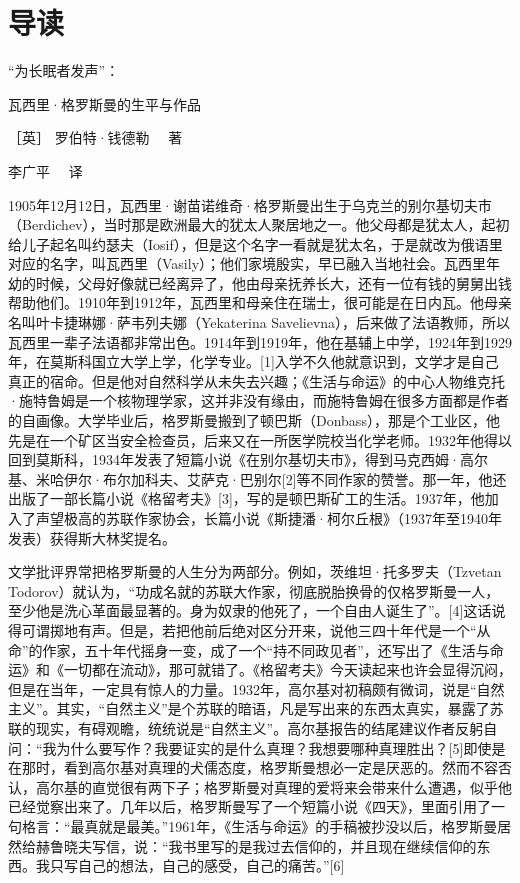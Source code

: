 \section{ 导读}


“为长眠者发声”：

瓦西里·格罗斯曼的生平与作品

［英］ 罗伯特·钱德勒　 著

李广平　 译

1905年12月12日，瓦西里·谢苗诺维奇·格罗斯曼出生于乌克兰的别尔基切夫市（Berdichev），当时那是欧洲最大的犹太人聚居地之一。他父母都是犹太人，起初给儿子起名叫约瑟夫（Iosif），但是这个名字一看就是犹太名，于是就改为俄语里对应的名字，叫瓦西里（Vasily）；他们家境殷实，早已融入当地社会。瓦西里年幼的时候，父母好像就已经离异了，他由母亲抚养长大，还有一位有钱的舅舅出钱帮助他们。1910年到1912年，瓦西里和母亲住在瑞士，很可能是在日内瓦。他母亲名叫叶卡捷琳娜·萨韦列夫娜（Yekaterina Savelievna），后来做了法语教师，所以瓦西里一辈子法语都非常出色。1914年到1919年，他在基辅上中学，1924年到1929年，在莫斯科国立大学上学，化学专业。[1]入学不久他就意识到，文学才是自己真正的宿命。但是他对自然科学从未失去兴趣；《生活与命运》的中心人物维克托·施特鲁姆是一个核物理学家，这并非没有缘由，而施特鲁姆在很多方面都是作者的自画像。大学毕业后，格罗斯曼搬到了顿巴斯（Donbass），那是个工业区，他先是在一个矿区当安全检查员，后来又在一所医学院校当化学老师。1932年他得以回到莫斯科，1934年发表了短篇小说《在别尔基切夫市》，得到马克西姆·高尔基、米哈伊尔·布尔加科夫、艾萨克·巴别尔[2]等不同作家的赞誉。那一年，他还出版了一部长篇小说《格留考夫》[3]，写的是顿巴斯矿工的生活。1937年，他加入了声望极高的苏联作家协会，长篇小说《斯捷潘·柯尔丘根》（1937年至1940年发表）获得斯大林奖提名。

文学批评界常把格罗斯曼的人生分为两部分。例如，茨维坦·托多罗夫（Tzvetan Todorov）就认为，“功成名就的苏联大作家，彻底脱胎换骨的仅格罗斯曼一人，至少他是洗心革面最显著的。身为奴隶的他死了，一个自由人诞生了”。[4]这话说得可谓掷地有声。但是，若把他前后绝对区分开来，说他三四十年代是一个“从命”的作家，五十年代摇身一变，成了一个“持不同政见者”，还写出了《生活与命运》和《一切都在流动》，那可就错了。《格留考夫》今天读起来也许会显得沉闷，但是在当年，一定具有惊人的力量。1932年，高尔基对初稿颇有微词，说是“自然主义”。其实，“自然主义”是个苏联的暗语，凡是写出来的东西太真实，暴露了苏联的现实，有碍观瞻，统统说是“自然主义”。高尔基报告的结尾建议作者反躬自问：“我为什么要写作？我要证实的是什么真理？我想要哪种真理胜出？[5]即使是在那时，看到高尔基对真理的犬儒态度，格罗斯曼想必一定是厌恶的。然而不容否认，高尔基的直觉很有两下子；格罗斯曼对真理的爱将来会带来什么遭遇，似乎他已经觉察出来了。几年以后，格罗斯曼写了一个短篇小说《四天》，里面引用了一句格言：“最真就是最美。”1961年，《生活与命运》的手稿被抄没以后，格罗斯曼居然给赫鲁晓夫写信，说：“我书里写的是我过去信仰的，并且现在继续信仰的东西。我只写自己的想法，自己的感受，自己的痛苦。”[6]

